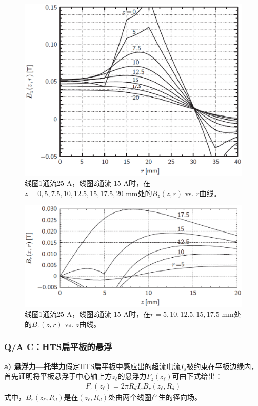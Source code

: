 \begin{figure}
	\centering
	\includegraphics[scale=0.5]{chpt9/figs/fig9.12.eps}
	\caption{线圈1通流25 A，线圈2通流-15 A时，在$z=0,5,7.5,10,12.5,15,17.5,20$ mm处的$B_z(z,r)$ vs. $r$曲线。}
\end{figure}

\begin{figure}
	\centering
	\includegraphics[scale=0.5]{chpt9/figs/fig9.13.eps}
	\caption{线圈1通流25 A，线圈2通流-15 A时，在$r=5,10,12.5,15,17.5$ mm处的$B_z(z,r)$ vs. $z$曲线。}
\end{figure}

\subsubsection{Q/A C：HTS扁平板的悬浮}
\textbf{a) 悬浮力---托举力}\qquad 假定HTS扁平板中感应出的超流电流$I_s$被约束在平板边缘内，
首先证明将平板悬浮于中心轴上方$z_\ell$的悬浮力$F_z(z_\ell)$可由下式给出：
\begin{align*}%
F_{z}(z_{\ell})=2\pi R_{d}I_{s}B_{r}(z_{\ell},R_{d})\tag{9.3a}
\end{align*}
式中，$B_{r}(z_{\ell},R_{d})$是在$(z_{\ell},R_{d})$处由两个线圈产生的径向场。


